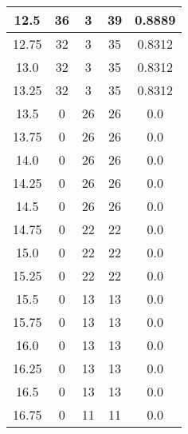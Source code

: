 \documentclass[letterpaper, 12pt]{article}
\begin{document}
\begin{longtable}{|c|c|c|c|c|}
12.5 & 36 & 3 & 39 & 0.8889 \\
\hline
12.75 & 32 & 3 & 35 & 0.8312 \\
\hline
13.0 & 32 & 3 & 35 & 0.8312 \\
\hline
13.25 & 32 & 3 & 35 & 0.8312 \\
\hline
13.5 & 0 & 26 & 26 & 0.0 \\
\hline
13.75 & 0 & 26 & 26 & 0.0 \\
\hline
14.0 & 0 & 26 & 26 & 0.0 \\
\hline
14.25 & 0 & 26 & 26 & 0.0 \\
\hline
14.5 & 0 & 26 & 26 & 0.0 \\
\hline
14.75 & 0 & 22 & 22 & 0.0 \\
\hline
15.0 & 0 & 22 & 22 & 0.0 \\
\hline
15.25 & 0 & 22 & 22 & 0.0 \\
\hline
15.5 & 0 & 13 & 13 & 0.0 \\
\hline
15.75 & 0 & 13 & 13 & 0.0 \\
\hline
16.0 & 0 & 13 & 13 & 0.0 \\
\hline
16.25 & 0 & 13 & 13 & 0.0 \\
\hline
16.5 & 0 & 13 & 13 & 0.0 \\
\hline
16.75 & 0 & 11 & 11 & 0.0 \\
\hline
\end{longtable}
\end{document}
